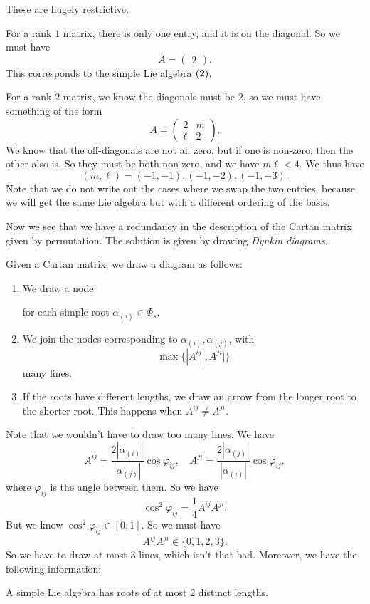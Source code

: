 \documentclass[a4paper]{article}
\begin{document}
These are hugely restrictive.
\begin{eg}
  For a rank $1$ matrix, there is only one entry, and it is on the diagonal. So we must have
  \[
    A =
    \begin{pmatrix}
      2
    \end{pmatrix}.
  \]
  This corresponds to the simple Lie algebra $\sl(2)$.
\end{eg}

\begin{eg}
  For a rank $2$ matrix, we know the diagonals must be $2$, so we must have something of the form
  \[
    A =
    \begin{pmatrix}
      2 & m\\
      \ell & 2
    \end{pmatrix}.
  \]
  We know that the off-diagonals are not all zero, but if one is non-zero, then the other also is. So they must be both non-zero, and we have $m\ell < 4$. We thus have
  \[
    (m, \ell) = (-1, -1), (-1, -2), (-1, -3).
  \]
  Note that we do not write out the cases where we swap the two entries, because we will get the same Lie algebra but with a different ordering of the basis.
\end{eg}

Now we see that we have a redundancy in the description of the Cartan matrix given by permutation. The solution is given by drawing \emph{Dynkin diagrams}.
\begin{defi}
  Given a Cartan matrix, we draw a diagram as follows:
  \begin{enumerate}
    \item We draw a node
      \begin{center}
      \end{center}
      for each simple root $\alpha_{(i)} \in \Phi_s$.
    \item We join the nodes corresponding to $\alpha_{(i)}, \alpha_{(j)}$, with
      \[
        \max\{|A^{ij}|, A^{ji}|\}
      \]
      many lines.
    \item If the roots have different lengths, we draw an arrow from the longer root to the shorter root. This happens when $A^{ij} \not= A^{ji}$.
  \end{enumerate}
\end{defi}
Note that we wouldn't have to draw too many lines. We have
\[
  A^{ij} = \frac{2|\alpha_{(i)}|}{|\alpha_{(j)}|} \cos \varphi_{ij},\quad A^{ji} = \frac{2|\alpha_{(j)}|}{|\alpha_{(i)}|} \cos \varphi_{ij},
\]
where $\varphi_{ij}$ is the angle between them. So we have
\[
  \cos^2 \varphi_{ij} = \frac{1}{4} A^{ij} A^{ji}.
\]
But we know $\cos^2 \varphi_{ij} \in [0, 1]$. So we must have
\[
  A^{ij} A^{ji} \in \{0, 1, 2, 3\}.
\]
So we have to draw at most $3$ lines, which isn't that bad. Moreover, we have the following information:
\begin{prop}
  A simple Lie algebra has roots of at most $2$ distinct lengths.
\end{prop}
\end{document}
